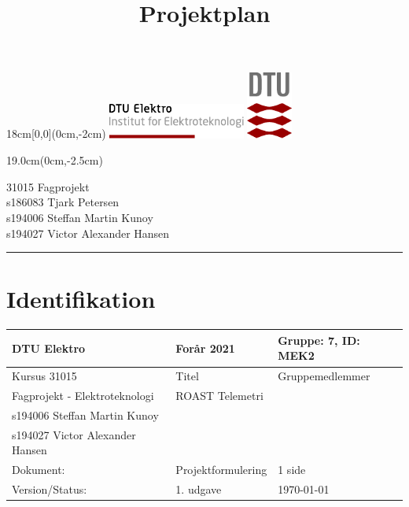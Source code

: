 \documentclass[]{article}
\title{Projektplan}
\begin{document}
\thispagestyle{empty}
\vspace*{-1.9cm}
\begin{textblock*}{18cm}[0,0](0cm,-2cm) %
  \noindent
  \includegraphics[width=4.5cm,valign=t]{documentation/resources/tex_dtu_elektro_a.pdf}
  \hspace*{10.6cm}
  \includegraphics[width=1.5cm,valign=t]{documentation/resources/tex_dtu_logo.pdf}
\end{textblock*}
\begin{textblock*}{19.0cm}(0cm,-2.5cm) %
\begin{center}
  {\color{dtured}\large31015 Fagprojekt}\\
  \normalsize
  s186083 Tjark Petersen\\
  s194006 Steffan Martin Kunoy\\
  s194027 Victor Alexander Hansen\\
\end{center}
\end{textblock*}
\vspace{1mm}
{\hspace*{-0.1cm}
\color{dtured}\noindent \rule{16.8cm}{5pt}}
 
\section{Identifikation}
 
\begin{table}[H]
     \centering
     \begin{tabularx}{\textwidth}{|X|X|X|}
     \hline
          DTU Elektro&Forår 2021 & Gruppe: 7, ID: MEK2 \\\hline
          Kursus 31015 & Titel & Gruppemedlemmer \\\hline
          Fagprojekt - Elektroteknologi & ROAST Telemetri & \begin{tabular}{l} s186083 Tjark Petersen\\s194006 Steffan Martin Kunoy\\s194027 Victor Alexander Hansen \end{tabular}\\\hline
          Dokument:& Projektformulering & 1 side\\\hline 
          Version/Status: & 1. udgave &\today\\\hline
     \end{tabularx}
 \end{table}
 
\end{document}
